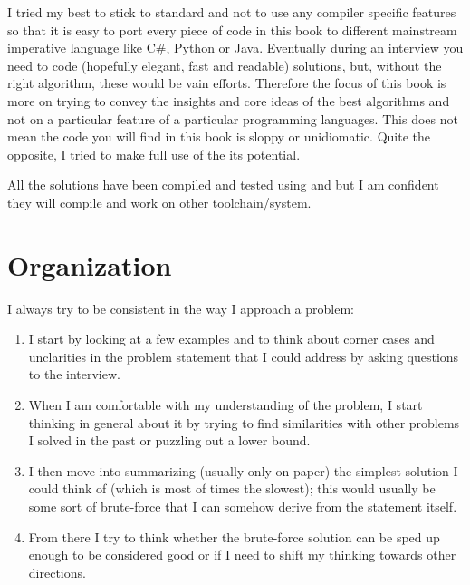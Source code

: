 I tried my best to stick to standard \CC and not to use any compiler specific features so that it is easy to port every piece of code in this book to different mainstream imperative language like C\#, Python or Java.  
Eventually during an interview you need to code (hopefully elegant, fast and readable) solutions, but, without the right algorithm, these would be vain efforts. Therefore the focus of this book is more on trying to convey the insights and core ideas of the best algorithms and not on a particular feature of a particular programming languages.
This does not mean the code you will find in this book is sloppy or \CC unidiomatic. Quite the opposite, I tried to make full use of the its potential.

All the solutions have been compiled and tested using  and  but I am confident they will compile and work on other toolchain/system. 

\section*{Organization}
I always try to be consistent in the way I approach a problem:
\begin{enumerate}
    \item I start by looking at a few examples and to think about corner cases and unclarities in the problem statement that I could address by asking questions to the interview.
    \item When I am comfortable with my understanding of the problem, I start thinking in general about it by trying to find similarities with other problems I solved in the past or puzzling out a lower bound.
    \item I then move into summarizing (usually only on paper) the simplest  solution I could think of (which is most of times the slowest); this would usually be some sort of brute-force that I can somehow derive from the statement itself.
    \item  From there I  try to think whether the brute-force solution can be sped up enough to be considered good or if I need to shift my thinking towards other directions.
\end{enumerate}

